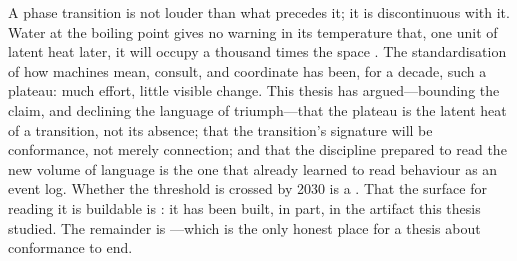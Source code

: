 A phase transition is not louder than what precedes it; it is discontinuous with
it. Water at the boiling point gives no warning in its temperature that, one unit
of latent heat later, it will occupy a thousand times the space
\citep{nationalboard-steam,latentheat-openstax}. The standardisation of how
machines mean, consult, and coordinate has been, for a decade, such a plateau:
much effort, little visible change. This thesis has argued---bounding the claim, and
declining the language of triumph---that the plateau is the latent heat of a
transition, not its absence; that the transition's signature will be conformance,
not merely connection; and that the discipline prepared to read the new volume of
language is the one that already learned to read behaviour as an event log. Whether
the threshold is crossed by 2030 is a \forecast. That the surface for reading it is
buildable is \admitted: it has been built, in part, in the artifact this thesis
studied. The remainder is \openstat---which is the only honest place for a thesis
about conformance to end.
